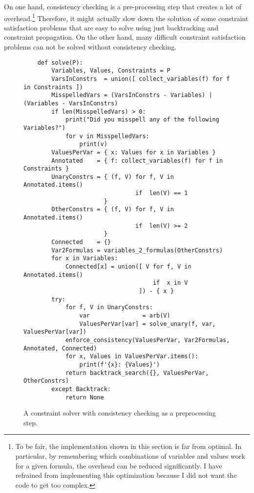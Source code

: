 On one hand, consistency checking is a pre-processing step that creates a lot of overhead.\footnote{
  To be fair, the implementation shown in this section is far from optimal.  In particular, by remembering which
  combinations of variables and values work for a given formula, the overhead can be reduced significantly.  I have
  refrained from implementing this optimization because I did not want the code to get too complex.
}
Therefore, it might actually slow down the
solution of some constraint satisfaction problems that are easy to solve using just backtracking and
constraint propagation.  On the other hand, many difficult constraint satisfaction problems can not be solved
without consistency checking. 


\begin{figure}[!ht]
\centering
\begin{verbatim}
    def solve(P):
        Variables, Values, Constraints = P
        VarsInConstrs  = union([ collect_variables(f) for f in Constraints ])
        MisspelledVars = (VarsInConstrs - Variables) | (Variables - VarsInConstrs)
        if len(MisspelledVars) > 0:
            print("Did you misspell any of the following Variables?")
            for v in MisspelledVars:
                print(v)
        ValuesPerVar = { x: Values for x in Variables }
        Annotated    = { f: collect_variables(f) for f in Constraints }
        UnaryConstrs = { (f, V) for f, V in Annotated.items() 
                                if  len(V) == 1 
                       }
        OtherConstrs = { (f, V) for f, V in Annotated.items() 
                                if  len(V) >= 2 
                       }
        Connected    = {}
        Var2Formulas = variables_2_formulas(OtherConstrs)
        for x in Variables:
            Connected[x] = union([ V for f, V in Annotated.items() 
                                     if  x in V 
                                 ]) - { x }
        try:
            for f, V in UnaryConstrs:
                var               = arb(V)
                ValuesPerVar[var] = solve_unary(f, var, ValuesPerVar[var])
            enforce_consistency(ValuesPerVar, Var2Formulas, Annotated, Connected)
            for x, Values in ValuesPerVar.items():
                print(f'{x}: {Values}')
            return backtrack_search({}, ValuesPerVar, OtherConstrs)
        except Backtrack:
            return None
\end{verbatim}
\vspace*{-0.3cm}
\caption{A constraint solver with consistency checking as a preprocessing step.}
\label{fig:Consistency-Solver.ipynb:solve}
\end{figure}

